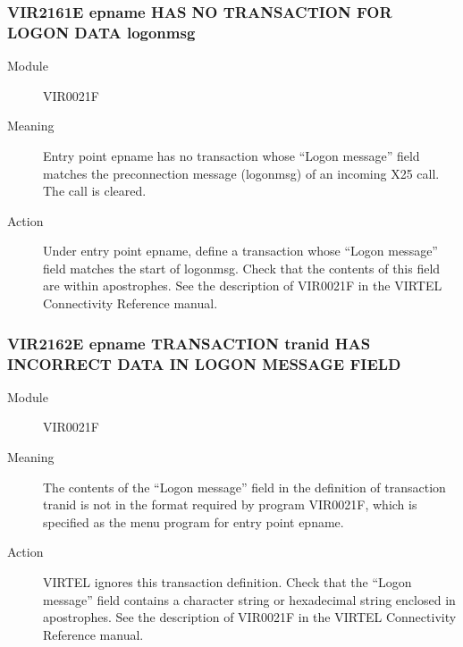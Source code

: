 \documentclass[letterpaper,10pt,english]{sphinxmanual}
\begin{document}
\subsubsection{VIR2161E epname HAS NO TRANSACTION FOR LOGON DATA logonmsg}
\label{\detokenize{messages:vir2161e-epname-has-no-transaction-for-logon-data-logonmsg}}\begin{description}
\item[{Module}] \leavevmode
VIR0021F

\item[{Meaning}] \leavevmode
Entry point epname has no transaction whose “Logon message” field matches the preconnection message (logonmsg) of an incoming X25 call. The call is cleared.

\item[{Action}] \leavevmode
Under entry point epname, define a transaction whose “Logon message” field matches the start of logonmsg. Check that the contents of this field are within apostrophes. See the description of VIR0021F in the VIRTEL Connectivity Reference manual.

\end{description}


\subsubsection{VIR2162E epname TRANSACTION tranid HAS INCORRECT DATA IN LOGON MESSAGE FIELD}
\label{\detokenize{messages:vir2162e-epname-transaction-tranid-has-incorrect-data-in-logon-message-field}}\begin{description}
\item[{Module}] \leavevmode
VIR0021F

\item[{Meaning}] \leavevmode
The contents of the “Logon message” field in the definition of transaction tranid is not in the format required by program VIR0021F, which is specified as the menu program for entry point epname.

\item[{Action}] \leavevmode
VIRTEL ignores this transaction definition. Check that the “Logon message” field contains a character string or hexadecimal string enclosed in apostrophes. See the description of VIR0021F in the VIRTEL Connectivity Reference manual.

\end{description}
\end{document}
